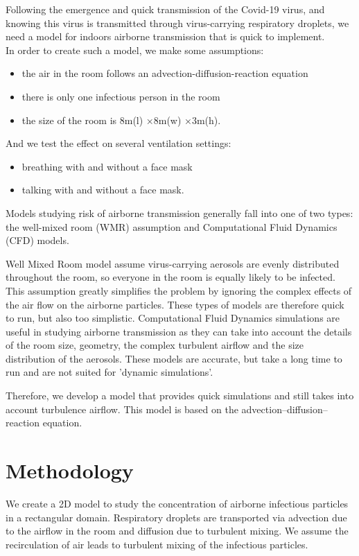 \documentclass[a4paper,10pt]{article}
\begin{document}
Following the emergence and quick transmission of the Covid-19 virus, and knowing this virus is transmitted through virus-carrying respiratory droplets, we need a model for indoors airborne transmission that is quick to implement. \\
In order to create such a model, we make some assumptions:
\begin{itemize}
    \item the air in the room follows an advection-diffusion-reaction equation
    \item there is only one infectious person in the room
    \item the size of the room is 8m(l) ×8m(w) ×3m(h). 
\end{itemize}
And we test the effect on several ventilation settings:
\begin{itemize}
    \item breathing with and without a face mask
    \item talking with and without a face mask.
\end{itemize}

Models studying risk of airborne transmission generally fall into one of two types: the well-mixed room (WMR) assumption and Computational Fluid Dynamics (CFD) models.

Well Mixed Room model assume virus-carrying aerosols are evenly distributed throughout the room, so everyone in the room is equally likely to be infected. This assumption greatly simplifies the problem by ignoring the complex effects of the air flow on the airborne particles. These types of models are therefore quick to run, but also too simplistic.
Computational Fluid Dynamics simulations are useful in studying airborne transmission as they can take into account the details of the room size, geometry, the complex turbulent airflow and the size distribution of the aerosols. These models are accurate, but take a long time to run and are not suited for 'dynamic  simulations'.

Therefore, we develop a model that provides quick simulations and still takes into account turbulence airflow.
This model is based on the advection–diffusion–reaction equation.

\section*{Methodology}

We create a  2D  model  to  study  the  concentration  of  airborne  infectious  particles  in  a rectangular domain.
Respiratory droplets are transported via advection due to the airflow in the room and diffusion due to turbulent mixing. We assume the recirculation of air leads to turbulent mixing of the infectious particles.
\end{document}

